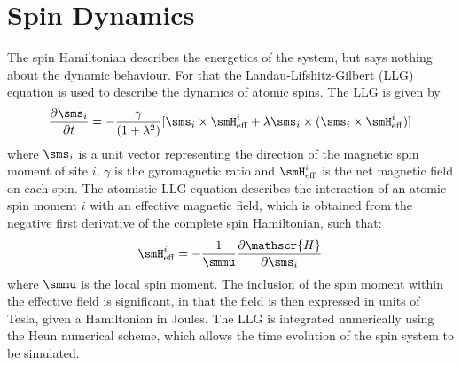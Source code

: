 \section*{Spin Dynamics}
The spin Hamiltonian describes the energetics of the system, but says nothing about the dynamic behaviour. For that the Landau-Lifshitz-Gilbert (LLG) equation is used to describe the dynamics of atomic spins. The LLG is given by
\begin{equation}\label{eqn:LLG}
\frac{\partial \sms_i }{\partial t} =
-\frac{\gamma}{(1+\lambda^{2})}[\sms_i \times
\smH^i_{\mathrm{eff}} + \lambda \sms_i \times
(\sms_i \times \smH^i_{\mathrm{eff}})]
\end{equation}
where $\sms_i$ is a unit vector representing the direction of the magnetic spin moment of site $i$, $\gamma$ is the gyromagnetic ratio and $\smH^i_{\mathrm{eff}}$ is the net magnetic field on each spin. The atomistic LLG equation describes the interaction of an atomic spin moment $i$ with an effective magnetic field, which is obtained from the negative first derivative of the complete spin Hamiltonian, such that:
\begin{equation}\label{eqn:Heff}
  \smH^i_{\mathrm{eff}} = -\frac{1}{\smmu}\frac{\partial \mathscr{H}}{\partial \sms_i}
\end{equation}
where $\smmu$ is the local spin moment. The inclusion of the spin moment within the effective field is significant, in that the field is then expressed in units of Tesla, given a Hamiltonian in Joules. The LLG is integrated numerically using the Heun numerical scheme, which allows the time evolution of the spin system to be simulated.



